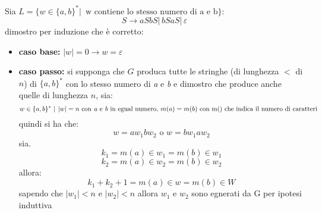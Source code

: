 \documentclass[a4paper,12pt, oneside]{book}
\begin{document}
\begin{esempio}
	Sia $L=\{w\in\{a,b\}^*|\, \mbox{ w contiene lo stesso numero di a e b}\}$:
	$$S\to aSbS|\,bSaS|\, \varepsilon$$
	dimostro per induzione che è corretto:
	\begin{itemize}
		\item \textbf{caso base:} $|w|=0\to w=\varepsilon$
		\item \textbf{caso passo:} si supponga che $G$ produca tutte le stringhe (di lunghezza $<$ di $n$) di $\{a,b\}^*$ con lo stesso numero di \textit{a} e \textit{b} e dimostro che produce anche quelle di lunghezza $n$, sia:
		      $$w\in \{a,b\}^* \mid\, |w|=n \mbox{ con\textit{ a} e \textit{b} in egual numero, }m(a)=m(b) \mbox{ con m() che indica il numero di caratteri}$$
		      quindi si ha che:
		      $$w=aw_1bw_2\mbox{ o } w=bw_1aw_2$$
		      sia.
		      $$k_1=m(a)\in w_1=m(b)\in w_1$$
		      $$k_2=m(a)\in w_2=m(b)\in w_2$$
		      allora:
		      $$k_1+k_2+1=m(a)\in w= m(b)\in W$$
		      sapendo che $|w_1|<n$ e $|w_2|<n$ allora $w_1$ e $w_2$ sono egnerati da G per ipotesi induttiva
	\end{itemize}
\end{esempio}
\end{document}

